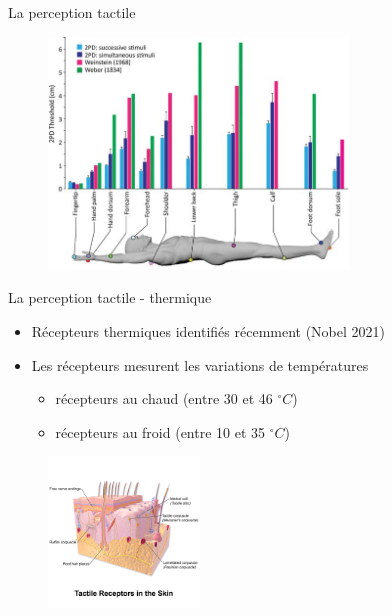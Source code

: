 {
\begin{frame}{La perception tactile}
\begin{figure}
\centering
\includegraphics[width=8cm]{images/tactile_acuity}
\end{figure}
\end{frame}
}

{
\begin{frame}{La perception tactile - thermique}
\begin{itemize}
\item Récepteurs thermiques identifiés récemment (Nobel 2021)
\item Les récepteurs mesurent les variations de températures
\begin{itemize}
\item récepteurs au chaud (entre 30 et 46 $^{\circ}C$)
\item récepteurs au froid (entre 10 et 35 $^{\circ}C$)
\end{itemize}
\end{itemize}
\begin{figure}
\centering
\includegraphics[width=4cm]{images/tactileReceptors}
\end{figure}
\end{frame}
}


